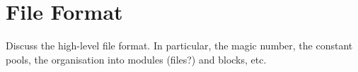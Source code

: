 \chapter{File Format}
Discuss the high-level file format.  In particular, the magic number, the constant pools, the organisation into modules (files?) and blocks, etc.

